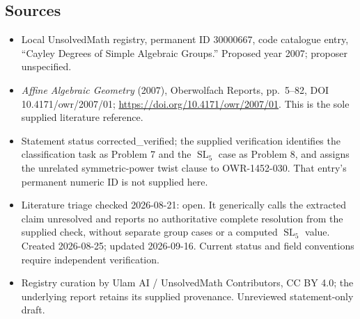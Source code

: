 \documentclass[11pt]{article}
\begin{document}
\subsection{Sources}
\begin{itemize}
\item Local UnsolvedMath registry, permanent ID 30000667, code catalogue entry, ``Cayley Degrees of Simple Algebraic Groups.'' Proposed year 2007; proposer unspecified.
\item \emph{Affine Algebraic Geometry} (2007), Oberwolfach Reports, pp.\ 5--82, DOI 10.4171/owr/2007/01; \url{https://doi.org/10.4171/owr/2007/01}. This is the sole supplied literature reference.
\item Statement status corrected\_verified; the supplied verification identifies the classification task as Problem 7 and the $\operatorname{SL}_5$ case as Problem 8, and assigns the unrelated symmetric-power twist clause to OWR-1452-030. That entry's permanent numeric ID is not supplied here.
\item Literature triage checked 2026-08-21: open. It generically calls the extracted claim unresolved and reports no authoritative complete resolution from the supplied check, without separate group cases or a computed $\operatorname{SL}_5$ value. Created 2026-08-25; updated 2026-09-16. Current status and field conventions require independent verification.
\item Registry curation by Ulam AI / UnsolvedMath Contributors, CC BY 4.0; the underlying report retains its supplied provenance. Unreviewed statement-only draft.
\end{itemize}
\end{document}
